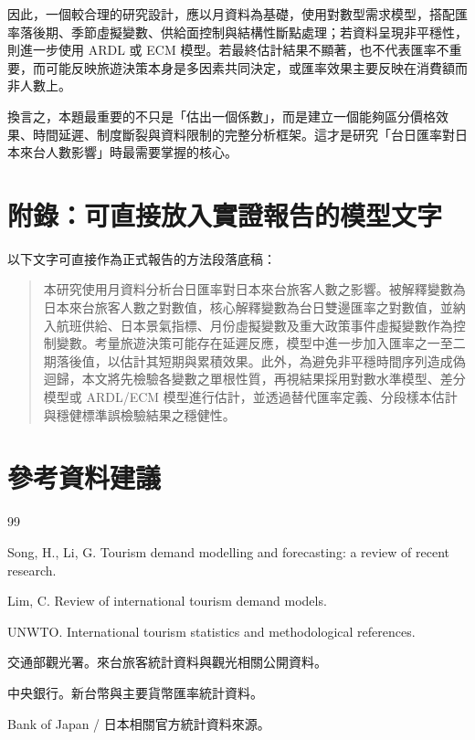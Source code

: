 \documentclass[12pt,a4paper,fontset=none]{ctexart}
\begin{document}
因此，一個較合理的研究設計，應以月資料為基礎，使用對數型需求模型，搭配匯率落後期、季節虛擬變數、供給面控制與結構性斷點處理；若資料呈現非平穩性，則進一步使用 ARDL 或 ECM 模型。若最終估計結果不顯著，也不代表匯率不重要，而可能反映旅遊決策本身是多因素共同決定，或匯率效果主要反映在消費額而非人數上。

換言之，本題最重要的不只是「估出一個係數」，而是建立一個能夠區分價格效果、時間延遲、制度斷裂與資料限制的完整分析框架。這才是研究「台日匯率對日本來台人數影響」時最需要掌握的核心。

\section*{附錄：可直接放入實證報告的模型文字}

以下文字可直接作為正式報告的方法段落底稿：

\begin{quote}
本研究使用月資料分析台日匯率對日本來台旅客人數之影響。被解釋變數為日本來台旅客人數之對數值，核心解釋變數為台日雙邊匯率之對數值，並納入航班供給、日本景氣指標、月份虛擬變數及重大政策事件虛擬變數作為控制變數。考量旅遊決策可能存在延遲反應，模型中進一步加入匯率之一至二期落後值，以估計其短期與累積效果。此外，為避免非平穩時間序列造成偽迴歸，本文將先檢驗各變數之單根性質，再視結果採用對數水準模型、差分模型或 ARDL/ECM 模型進行估計，並透過替代匯率定義、分段樣本估計與穩健標準誤檢驗結果之穩健性。
\end{quote}

\section*{參考資料建議}

\begin{thebibliography}{99}

Song, H., Li, G. Tourism demand modelling and forecasting: a review of recent research.

Lim, C. Review of international tourism demand models.

UNWTO. International tourism statistics and methodological references.

交通部觀光署。來台旅客統計資料與觀光相關公開資料。

中央銀行。新台幣與主要貨幣匯率統計資料。

Bank of Japan / 日本相關官方統計資料來源。

\end{thebibliography}
\end{document}
